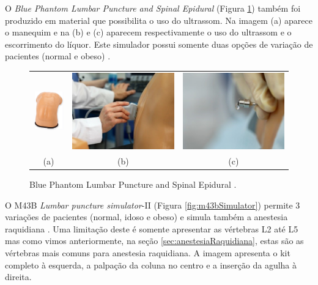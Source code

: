 O \textit{Blue Phantom Lumbar Puncture and Spinal Epidural} (Figura \ref{fig:bluePhantom}) também foi produzido em material que possibilita o uso do ultrassom. Na imagem (a) aparece o manequim e na (b) e (c) aparecem respectivamente o uso do ultrassom e o escorrimento do líquor. Este simulador possui somente duas opções de variação de pacientes (normal e obeso) \cite{BluePhantom2011}. 

\begin{figure}[ht!]
    \centering
        \begin{tabular}{ccc}
        \includegraphics[width=0.17\linewidth]{capitulos/figuras/BluePhatom-manequim.png} & 
        \includegraphics[width=0.3\linewidth]{capitulos/figuras/BluePhatom-ultrassom.jpg} 
        &
        \includegraphics[width=0.3\linewidth]{capitulos/figuras/BluePhatom-escorrimentoLiquor.jpg} 
        \\
        (a) & (b) & (c)
        \end{tabular}
    \caption{Blue Phantom Lumbar Puncture and Spinal Epidural \cite{BluePhantom2011}.}
    \label{fig:bluePhantom}
\end{figure}

O M43B \textit{Lumbar puncture simulator}-II (Figura \ref{fig:m43bSimulator}) permite 3 variações de pacientes (normal, idoso e obeso) e simula também a anestesia raquidiana \cite{KyotokagakuCo.2011}. Uma limitação deste é somente apresentar as vértebras L2 até L5 mas como vimos anteriormente, na seção \ref{sec:anestesiaRaquidiana}, estas são as vértebras mais comuns para anestesia raquidiana. A imagem apresenta o kit completo à esquerda, a palpação da coluna no centro e a inserção da agulha à direita.

